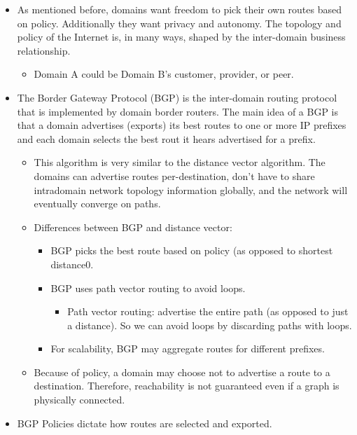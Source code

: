 \documentclass[]{article}
\providecommand{\tightlist}{%
  \setlength{\itemsep}{0pt}\setlength{\parskip}{0pt}}
\begin{document}
\begin{itemize}
\tightlist
\item
  As mentioned before, domains want freedom to pick their own routes
  based on policy. Additionally they want privacy and autonomy. The
  topology and policy of the Internet is, in many ways, shaped by the
  inter-domain business relationship.

  \begin{itemize}
  \tightlist
  \item
    Domain A could be Domain B's customer, provider, or peer.
  \end{itemize}
\item
  The Border Gateway Protocol (BGP) is the inter-domain routing protocol
  that is implemented by domain border routers. The main idea of a BGP
  is that a domain advertises (exports) its best routes to one or more
  IP prefixes and each domain selects the best rout it hears advertised
  for a prefix.

  \begin{itemize}
  \tightlist
  \item
    This algorithm is very similar to the distance vector algorithm. The
    domains can advertise routes per-destination, don't have to share
    intradomain network topology information globally, and the network
    will eventually converge on paths.
  \item
    Differences between BGP and distance vector:

    \begin{itemize}
    \tightlist
    \item
      BGP picks the best route based on policy (as opposed to shortest
      distance0.
    \item
      BGP uses path vector routing to avoid loops.

      \begin{itemize}
      \tightlist
      \item
        Path vector routing: advertise the entire path (as opposed to
        just a distance). So we can avoid loops by discarding paths with
        loops.
      \end{itemize}
    \item
      For scalability, BGP may aggregate routes for different prefixes.
    \end{itemize}
  \item
    Because of policy, a domain may choose not to advertise a route to a
    destination. Therefore, reachability is not guaranteed even if a
    graph is physically connected.
  \end{itemize}
\item
  BGP Policies dictate how routes are selected and exported.


\end{itemize}
\end{document}
